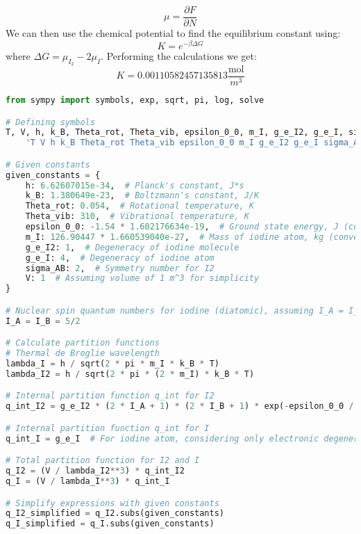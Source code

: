\documentclass[12pt]{article}
\begin{document}
\begin{enumerate}
\begin{equation}
  \mu = \frac{\partial F}{\partial N}
\end{equation}
We can then use the chemical potential to find the equilibrium constant using:
\begin{equation}
  K = e^{-\beta \Delta G}
\end{equation}
where $\Delta G = \mu_{I_2} - 2\mu_{I}$. 
Performing the calculations we get:
\begin{equation}
  K = 0.00110582457135813 \frac{\text{mol}}{m^3}
\end{equation}
\begin{lstlisting}[language=Python]
from sympy import symbols, exp, sqrt, pi, log, solve

# Defining symbols
T, V, h, k_B, Theta_rot, Theta_vib, epsilon_0_0, m_I, g_e_I2, g_e_I, sigma_AB = symbols(
    'T V h k_B Theta_rot Theta_vib epsilon_0_0 m_I g_e_I2 g_e_I sigma_AB')

# Given constants
given_constants = {
    h: 6.62607015e-34,  # Planck's constant, J*s
    k_B: 1.380649e-23,  # Boltzmann's constant, J/K
    Theta_rot: 0.054,  # Rotational temperature, K
    Theta_vib: 310,  # Vibrational temperature, K
    epsilon_0_0: -1.54 * 1.602176634e-19,  # Ground state energy, J (converted from eV)
    m_I: 126.90447 * 1.660539040e-27,  # Mass of iodine atom, kg (converted from u to kg)
    g_e_I2: 1,  # Degeneracy of iodine molecule
    g_e_I: 4,  # Degeneracy of iodine atom
    sigma_AB: 2,  # Symmetry number for I2
    V: 1  # Assuming volume of 1 m^3 for simplicity
}

# Nuclear spin quantum numbers for iodine (diatomic), assuming I_A = I_B = 5/2
I_A = I_B = 5/2

# Calculate partition functions
# Thermal de Broglie wavelength
lambda_I = h / sqrt(2 * pi * m_I * k_B * T)
lambda_I2 = h / sqrt(2 * pi * (2 * m_I) * k_B * T)

# Internal partition function q_int for I2
q_int_I2 = g_e_I2 * (2 * I_A + 1) * (2 * I_B + 1) * exp(-epsilon_0_0 / (k_B * T)) * (T / Theta_rot) * (1 / (1 - exp(-Theta_vib / T))) / sigma_AB

# Internal partition function q_int for I
q_int_I = g_e_I  # For iodine atom, considering only electronic degeneracy

# Total partition function for I2 and I
q_I2 = (V / lambda_I2**3) * q_int_I2
q_I = (V / lambda_I**3) * q_int_I

# Simplify expressions with given constants
q_I2_simplified = q_I2.subs(given_constants)
q_I_simplified = q_I.subs(given_constants)


\end{lstlisting}
\end{enumerate}
\end{document}
